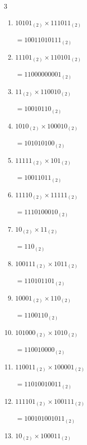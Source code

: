 \begin{multicols}{3}
\begin{enumerate}
  \item $10101_{(2)} \times 111011_{(2)}$

        $=10011010111_{(2)}$

  \item $11101_{(2)} \times 110101_{(2)}$

        $=11000000001_{(2)}$

\columnbreak %

\resetques

  \item $11_{(2)} \times 110010_{(2)}$

        $=10010110_{(2)}$

  \item $1010_{(2)} \times 100010_{(2)}$

        $=101010100_{(2)}$

  \item $11111_{(2)} \times 101_{(2)}$

        $=10011011_{(2)}$

  \item $11110_{(2)} \times 11111_{(2)}$

        $=1110100010_{(2)}$

  \item $10_{(2)} \times 11_{(2)}$

        $=110_{(2)}$

\columnbreak %

  \item $100111_{(2)} \times 1011_{(2)}$

        $=110101101_{(2)}$

  \item $10001_{(2)} \times 110_{(2)}$

        $=1100110_{(2)}$

  \item $101000_{(2)} \times 1010_{(2)}$

        $=110010000_{(2)}$

  \item $110011_{(2)} \times 100001_{(2)}$

        $=11010010011_{(2)}$

  \item $111101_{(2)} \times 100111_{(2)}$

        $=100101001011_{(2)}$

\columnbreak %

  \item $10_{(2)} \times 100011_{(2)}$


\end{enumerate}
\end{multicols}
